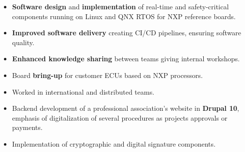 \documentclass[10pt,a4paper,ragged2e,withhyper]{altacv}
\begin{document}
    \begin{paracol}{2}
    

     
                \begin{itemize}
                    \item \textbf{Software design} and \textbf{implementation} of real-time and safety-critical components running on Linux and QNX RTOS for NXP reference boards.
                    \item \textbf{Improved software delivery} creating CI/CD pipelines, ensuring software quality. 
                    \item \textbf{Enhanced knowledge sharing} between teams giving internal workshops.                    
                    \item Board \textbf{bring-up} for customer ECUs based on NXP processors.
                    \item Worked in international and distributed teams.
                \end{itemize}

                \divider\newline
        
            
                \begin{itemize}
                    \item Backend development of a professional association's website in \textbf{Drupal 10}, emphasis of digitalization of several procedures as projects approvals or payments.
                    \item Implementation of cryptographic and digital signature components.
                \end{itemize}
                
            
                

\end{paracol}
\end{document}
